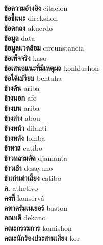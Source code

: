 \textbf{ ข้อความอ้างอิง  } citacion \\
\textbf{ ข้อชี้แนะ  } direkshon \\
\textbf{ ข้อตกลง  } akuerdo \\
\textbf{ ข้อมูล  } data \\
\textbf{ ข้อมูลแวดล้อม  } circunstancia \\
\textbf{ ข้อเท็จจริง  } kaso \\
\textbf{ ข้อเสนอแนะที่มีเหตุผล  } konklushon \\
\textbf{ ข้อได้เปรียบ  } bentaha \\
\textbf{ ข้างต้น  } ariba \\
\textbf{ ข้างนอก  } afo \\
\textbf{ ข้างบน  } ariba \\
\textbf{ ข้างล่าง  } abou \\
\textbf{ ข้างหน้า  } dilanti \\
\textbf{ ข้างหลัง  } lomba \\
\textbf{ ข้าทาส  } catibo \\
\textbf{ ข้าวหลามตัด  } djamanta \\
\textbf{ ข้าวเช้า  } desayuno \\
\textbf{ ข้าเก่าเต่าเลี้ยง  } catibo \\
\textbf{ ค.  } athetivo \\
\textbf{ คงที่  } konservá \\
\textbf{ คฑาดรัมเมเยอร์  } baston \\
\textbf{ คณบดี  } dekano \\
\textbf{ คณะกรรมการ  } komishon \\
\textbf{ คณะนักร้องประสานเสียง  } kor \\
